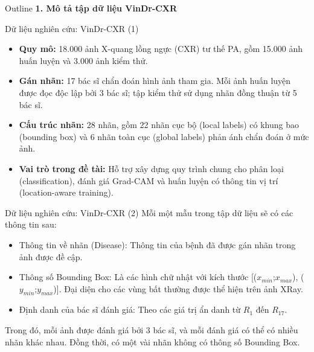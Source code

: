 \documentclass[10pt]{beamer}
\begin{document}
\begin{frame}{Outline}
    \centering
    \Large \textbf{1. Mô tả tập dữ liệu VinDr-CXR}
\end{frame}

\begin{frame}{Dữ liệu nghiên cứu: VinDr-CXR (1)}
    \begin{itemize}
        \item \textbf{Quy mô:} 18.000 ảnh X-quang lồng ngực (CXR) tư thế PA, gồm 15.000 ảnh huấn luyện và 3.000 ảnh kiểm thử.
        \item \textbf{Gán nhãn:} 17 bác sĩ chẩn đoán hình ảnh tham gia. Mỗi ảnh huấn luyện được đọc độc lập bởi 3 bác sĩ; tập kiểm thử sử dụng nhãn đồng thuận từ 5 bác sĩ.
        \item \textbf{Cấu trúc nhãn:} 28 nhãn, gồm 22 nhãn cục bộ (local labels) có khung bao (bounding box) và 6 nhãn toàn cục (global labels) phản ánh chẩn đoán ở mức ảnh.
        \item \textbf{Vai trò trong đề tài:} Hỗ trợ xây dựng quy trình chung cho phân loại (classification), đánh giá Grad-CAM và huấn luyện có thông tin vị trí (location-aware training).
    \end{itemize}
\end{frame}

\begin{frame}{Dữ liệu nghiên cứu: VinDr-CXR (2)}
    Mỗi một mẫu trong tập dữ liệu sẽ có các thông tin sau:
    \begin{itemize}
        \item Thông tin về nhãn (Disease): Thông tin của bệnh đã được gán nhãn trong ảnh được đề cập.
        \item Thông số Bounding Box: Là các hình chữ nhật với kích thước [($x_{min}$;$x_{max}$), ($y_{min}$;$y_{max}$)]. Đại diện cho các vùng bất thường được thể hiện trên ảnh XRay.
        \item Định danh của bác sĩ đánh giá: Theo các giá trị ẩn danh từ $R_1$ đến $R_{17}$.
    \end{itemize}
    \vspace{1em}
    Trong đó, mỗi ảnh được đánh giá bởi 3 bác sĩ, và mỗi đánh giá có thể có nhiều nhãn khác nhau. Đồng thời, có một vài nhãn không có thông số Bounding Box.
\end{frame}
\end{document}
